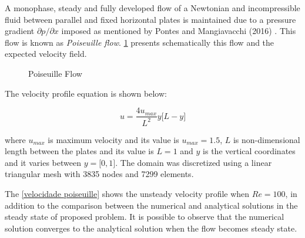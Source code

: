 A monophase, steady and fully developed flow of a Newtonian 
and incompressible fluid between parallel and fixed horizontal 
plates is maintained due to a pressure gradient 
$\partial p/ \partial x$ imposed as mentioned by Pontes 
and Mangiavacchi (2016) \cite{pontes2016}. 
This flow is known as \textit{Poiseuille flow}. 
\ref{poiseuille} presents schematically this flow and 
the expected velocity field.

\begin{figure}[H]
\begin{center}
\end{center}
\caption{Poiseuille Flow}
\label{poiseuille}
\end{figure}

\noindent
The velocity profile equation is shown below:

\begin{equation}
 u = \frac{4 u_{max}}{L^2} y \big[ L - y \big]
\end{equation}

\medskip
\noindent
where $u_{max}$ is maximum velocity and its value is 
$u_{max} = 1.5$, $L$ is non-dimensional length 
between the plates and its value is 
$L = 1$
and $y$ is the vertical coordinates and it varies 
between $y = \big[ 0,1 \big]$.
The domain was discretized using a linear triangular mesh
with 3835 nodes and 7299 elements.

\bigskip
The \ref{velocidade poiseuille} shows the unsteady velocity profile
when $Re=100$, in addition to the comparison between the 
numerical and analytical solutions in the steady state of
proposed problem. It is possible to observe that the numerical
solution converges to the analytical solution when the flow
becomes steady state.

